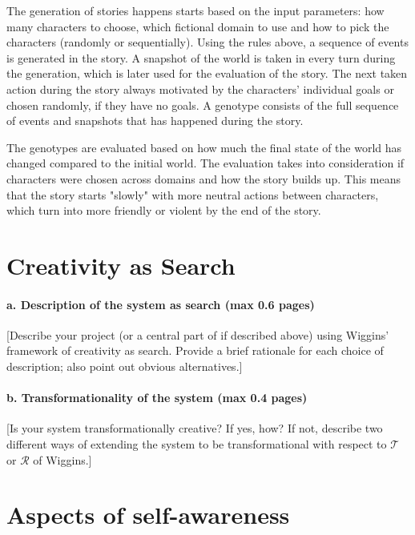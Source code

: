 \documentclass[english]{tktltiki}
\begin{document}
    The generation of stories happens starts based on the input parameters: how many characters to choose, which fictional domain to use and how to pick the characters (randomly or sequentially). Using the rules above, a sequence of events is generated in the story. A snapshot of the world is taken in every turn during the generation, which is later used for the evaluation of the story. The next taken action during the story always motivated by the characters' individual goals or chosen randomly, if they have no goals. A genotype consists of the full sequence of events and snapshots that has happened during the story. 

    The genotypes are evaluated based on how much the final state of the world has changed compared to the initial world. The evaluation takes into consideration if characters were chosen across domains and how the story builds up. This means that the story starts "slowly" with more neutral actions between characters, which turn into more friendly or violent by the end of the story.
    
    \pagebreak
    
    \section{Creativity as Search}
    
    \paragraph{a. Description of the system as search (max 0.6 pages)}
    
    [Describe your project (or a central part of if described above) using Wiggins' framework of creativity as search. Provide a brief rationale for each choice of description; also point out obvious alternatives.]
    
    \paragraph{b. Transformationality of the system (max 0.4 pages)}
    
    [Is your system transformationally creative? If yes, how? If not, describe two different ways of extending the system to be transformational with respect to $\mathcal{T}$ or $\mathcal{R}$ of Wiggins.]
    
    
    \pagebreak
    
    \section{Aspects of self-awareness}
    
\end{document}

